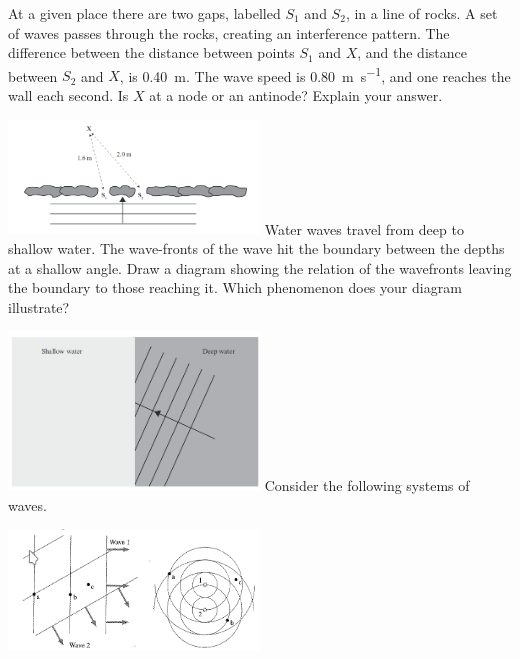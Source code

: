 \documentclass[a4paper]{exam}
\begin{document}
\begin{questions}
    \question At a given place there are two gaps, labelled $ S_1 $ and $S_2 $, in a line of rocks. A set of waves
              passes through the rocks, creating an interference pattern. The difference between the distance between
              points $ S_1 $ and $ X $, and the distance between $ S_2 $ and $ X $, is \SI{0.40}{\metre}. The wave
              speed is \SI{0.80}{\metre\per\second}, and one reaches the wall each second. Is $ X $ at a node or an antinode?
              Explain your answer.

              \includegraphics[width=0.5\textwidth]{nzqa20141}
    \question Water waves travel from deep to shallow water. The wave-fronts of the wave hit the boundary between the depths at
              a shallow angle. Draw a diagram showing the relation of the wavefronts leaving the boundary to those reaching it.
              Which phenomenon does your diagram illustrate?

              \includegraphics[width=0.5\textwidth]{nzqa20142}
    \question Consider the following systems of waves.

              \includegraphics[width=0.5\textwidth]{knight1789}
      \begin{parts}

\end{parts}
\end{questions}
\end{document}
